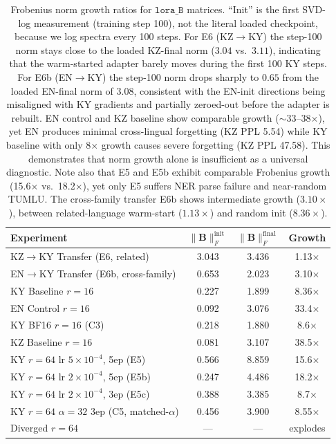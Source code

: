 \documentclass[11pt]{article}
\begin{document}
\begin{table}[t]
\centering
\small
\begin{tabular}{lccc}
\toprule
\textbf{Experiment} & $\|\mathbf{B}\|_F^{\text{init}}$ & $\|\mathbf{B}\|_F^{\text{final}}$ & \textbf{Growth} \\
\midrule
KZ$\rightarrow$KY Transfer (E6, related) & 3.043 & 3.436 & 1.13$\times$ \\
EN$\rightarrow$KY Transfer (E6b, cross-family) & 0.653 & 2.023 & 3.10$\times$ \\
KY Baseline $r{=}16$ & 0.227 & 1.899 & 8.36$\times$ \\
EN Control $r{=}16$ & 0.092 & 3.076 & 33.4$\times$ \\
KY BF16 $r{=}16$ (C3) & 0.218 & 1.880 & 8.6$\times$ \\
KZ Baseline $r{=}16$ & 0.081 & 3.107 & 38.5$\times$ \\
KY $r{=}64$ lr $5{\times}10^{-4}$, 5ep (E5) & 0.566 & 8.859 & 15.6$\times$ \\
KY $r{=}64$ lr $2{\times}10^{-4}$, 5ep (E5b) & 0.247 & 4.486 & 18.2$\times$ \\
KY $r{=}64$ lr $2{\times}10^{-4}$, 3ep (E5c) & 0.388 & 3.385 & 8.7$\times$ \\
KY $r{=}64$ $\alpha{=}32$ 3ep (C5, matched-$\alpha$) & 0.456 & 3.900 & 8.55$\times$ \\
Diverged $r{=}64$ & --- & --- & explodes \\
\bottomrule
\end{tabular}
\caption{Frobenius norm growth ratios for $\texttt{lora\_B}$ matrices. ``Init'' is the first SVD-log measurement (training step 100), not the literal loaded checkpoint, because we log spectra every 100 steps. For E6 (KZ$\rightarrow$KY) the step-100 norm stays close to the loaded KZ-final norm ($3.04$ vs.\ $3.11$), indicating that the warm-started adapter barely moves during the first 100 KY steps. For E6b (EN$\rightarrow$KY) the step-100 norm drops sharply to $0.65$ from the loaded EN-final norm of $3.08$, consistent with the EN-init directions being misaligned with KY gradients and partially zeroed-out before the adapter is rebuilt. EN control and KZ baseline show comparable growth ($\sim$33--38$\times$), yet EN produces minimal cross-lingual forgetting (KZ PPL 5.54) while KY baseline with only 8$\times$ growth causes severe forgetting (KZ PPL 47.58). This demonstrates that norm growth alone is insufficient as a universal diagnostic. Note also that E5 and E5b exhibit comparable Frobenius growth (15.6$\times$ vs.\ 18.2$\times$), yet only E5 suffers NER parse failure and near-random TUMLU. The cross-family transfer E6b shows intermediate growth ($3.10\times$), between related-language warm-start ($1.13\times$) and random init ($8.36\times$).}
\label{tab:frobenius}
\end{table}
\end{document}
